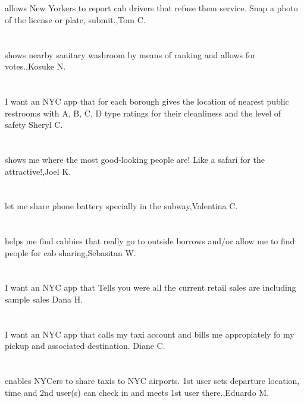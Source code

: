 \section{}allows New Yorkers to report cab drivers that refuse them service. Snap a photo of the license or plate, submit.,Tom C.	
\section{}shows nearby sanitary washroom by means of ranking and allows for votes.,Kosuke N.	
\section{} I want an NYC app that for each borough gives the location of nearest public restrooms with A, B, C, D type ratings for their cleanliness and the level of safety     Sheryl C.	
\section{}shows me where the most good-looking people are! Like a safari for the attractive!,Joel K.	
\section{}let me share phone battery specially in the subway,Valentina C.	
\section{}helps me find cabbies that really go to outside borrows and/or allow me to find people for cab sharing,Sebasitan W.	
\section{} I want an NYC app that Tells you were all the current retail sales are including sample sales  Dana H.	
\section{}I want an NYC app that calls my taxi account and bills me appropiately fo my pickup and associated destination.  Diane C.	
\section{} enables NYCers to share taxis to NYC airports. 1st user sets departure location, time and 2nd user(s) can check in and meets 1st user there.,Eduardo M.	
